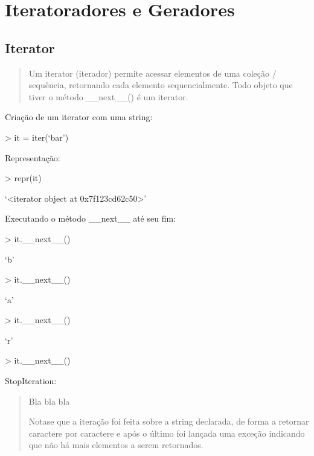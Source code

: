 \documentclass[letterpaper,10pt,brazil]{sphinxmanual}
\begin{document}
\begin{sphinxVerbatim}[commandchars=\\\{\}]
\end{sphinxVerbatim}

\begin{sphinxVerbatim}[commandchars=\\\{\}]
\end{sphinxVerbatim}

\begin{sphinxVerbatim}[commandchars=\\\{\}]
\end{sphinxVerbatim}


\chapter{Iteratoradores e Geradores}
\label{\detokenize{content/iter_gen:iteratoradores-e-geradores}}\label{\detokenize{content/iter_gen::doc}}

\section{Iterator}
\label{\detokenize{content/iter_gen:iterator}}\begin{quote}

Um iterator (iterador) permite acessar elementos de uma coleção / sequência, retornando cada elemento sequencialmente.
Todo objeto que tiver o método \_\_next\_\_() é um iterator.
\end{quote}

Criação de um iterator com uma string:

\textgreater{} it = iter(‘bar’)

Representação:

\textgreater{} repr(it)

‘\textless{}iterator object at 0x7f123cd62c50\textgreater{}’

Executando o método \_\_next\_\_ até seu fim:

\textgreater{} it.\_\_next\_\_()

‘b’

\textgreater{} it.\_\_next\_\_()

‘a’

\textgreater{} it.\_\_next\_\_()

‘r’

\textgreater{} it.\_\_next\_\_()

StopIteration:
\begin{quote}

Bla bla bla

Nota\sphinxhyphen{}se que a iteração foi feita sobre a string declarada, de forma a retornar caractere por caractere e após o último foi lançada uma exceção indicando que não há mais elementos a serem retornados.
\end{quote}
\end{document}
